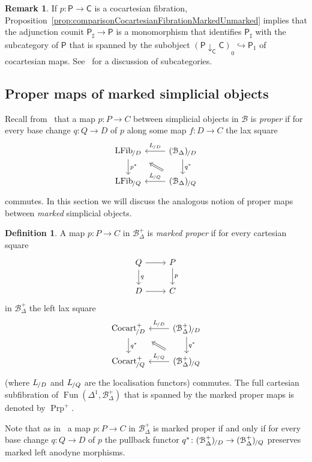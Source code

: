 \documentclass[reqno]{amsart}
\numberwithin{equation}{subsection}
\theoremstyle{plain}
\theoremstyle{definition}
\newtheorem{definition}[equation]{Definition}
\newtheorem{remark}[equation]{Remark}
\let\scr=\mathcal
\let\into=\hookrightarrow
\def\BB{\scr B}
\DeclareMathOperator{\Cocart}{Cocart}
\DeclareMathOperator{\LFib}{LFib}
\DeclareMathOperator{\Fun}{Fun}
\DeclareMathOperator{\Prop}{Prp}
\newcommand{\Over}[2]{#1_{\hspace{-1pt}/#2}}
\newcommand{\I}[1]{\mathsf{#1}}
\newcommand{\Comma}[3]{{#1}\downarrow_{#2}{#3}}
\newcommand{\Simp}[1]{#1_{\Delta}}
\newcommand{\mSimp}[1]{#1_{\Delta}^+}
\begin{document}
\begin{remark}
	\label{rem:coreflectionCocartLFibExplicitly}
	If $p\colon \I{P}\to\I{C}$ is a cocartesian fibration, Proposition~\ref{prop:comparisonCocartesianFibrationMarkedUnmarked} implies that the adjunction counit $\I{P}_\sharp\to \I{P}$ is a monomorphism that identifies $\I{P}_\sharp$ with the subcategory of $\I{P}$ that is spanned by the subobject $(\Comma{\I{P}}{\I{C}}{\I{C}})_0\into\I{P}_1$ of cocartesian maps. See~\cite[\S~2.9]{Martini2021a} for a discussion of subcategories.
\end{remark}

\subsection{Proper maps of marked simplicial objects}
\label{sec:markedProper}
Recall from~\cite[\S~4.4]{Martini2021} that a map $p\colon P\to C$ between simplicial objects in $\BB$ is \emph{proper} if for every base change $q\colon Q\to D$ of $p$ along some map $f\colon D\to C$ the lax square
\begin{equation*}
	\begin{tikzcd}
		\Over{\LFib}{D}\arrow[d, "p^\ast"]\arrow[from=r, "\Over{L}{D}"'] & \Over{(\Simp\BB)}{D}\arrow[d, "q^\ast"]\\
		\Over{\LFib}{Q}\arrow[from=r, "\Over{L}{Q}"'] & \Over{(\Simp\BB)}{Q}\arrow[ul, Rightarrow, shorten=3mm]
	\end{tikzcd}
\end{equation*}
commutes. In this section we will discuss the analogous notion of proper maps between \emph{marked} simplicial objects.

\begin{definition}
	\label{def:proper}
	A map $p\colon P\to C$ in $\mSimp\BB$ is \emph{marked proper} if for every cartesian square
	\begin{equation*}
			\begin{tikzcd}
				Q\arrow[d, "q"]\arrow[r] & P\arrow[d, "p"]\\
				D\arrow[r] & C
			\end{tikzcd}
	\end{equation*}
	in $\mSimp\BB$ the left lax square
	\begin{equation*}
		\begin{tikzcd}
				\Over{\Cocart^+}{D}\arrow[d, "q^\ast"]\arrow[from=r, "\Over{L}{D}"'] & \Over{(\mSimp\BB)}{D}\arrow[d, "q^\ast"]\\
				\Over{\Cocart^+}{Q}\arrow[from=r, "\Over{L}{Q}"'] & \Over{(\mSimp\BB)}{Q}\arrow[ul, Rightarrow, shorten=3mm]
			\end{tikzcd}
	\end{equation*}
	(where $\Over{L}{D}$ and $\Over{L}{Q}$ are the localisation functors) commutes. The full cartesian subfibration of $\Fun(\Delta^1,\mSimp\BB)$ that is spanned by the marked proper maps is denoted by $\Prop^+$.
\end{definition}
Note that as in~\cite[\S~4.4]{Martini2021} a map $p\colon P\to C$ in $\mSimp\BB$ is marked proper if and only if for every base change $q\colon Q\to D$ of $p$ the pullback functor $q^\ast\colon \Over{(\mSimp\BB)}{D}\to\Over{(\mSimp\BB)}{Q}$ preserves marked left anodyne morphisms.
\end{document}
